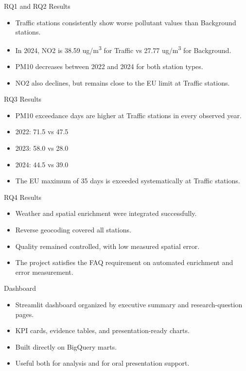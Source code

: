 \documentclass[aspectratio=169]{beamer}
\begin{document}
\begin{frame}{RQ1 and RQ2 Results}
\begin{itemize}
  \item Traffic stations consistently show worse pollutant values than Background stations.
  \item In 2024, NO2 is 38.59 ug/m\textsuperscript{3} for Traffic vs 27.77 ug/m\textsuperscript{3} for Background.
  \item PM10 decreases between 2022 and 2024 for both station types.
  \item NO2 also declines, but remains close to the EU limit at Traffic stations.
\end{itemize}
\end{frame}

\begin{frame}{RQ3 Results}
\begin{itemize}
  \item PM10 exceedance days are higher at Traffic stations in every observed year.
  \item 2022: 71.5 vs 47.5
  \item 2023: 58.0 vs 28.0
  \item 2024: 44.5 vs 39.0
  \item The EU maximum of 35 days is exceeded systematically at Traffic stations.
\end{itemize}
\end{frame}

\begin{frame}{RQ4 Results}
\begin{itemize}
  \item Weather and spatial enrichment were integrated successfully.
  \item Reverse geocoding covered all stations.
  \item Quality remained controlled, with low measured spatial error.
  \item The project satisfies the FAQ requirement on automated enrichment and error measurement.
\end{itemize}
\end{frame}

\begin{frame}{Dashboard}
\begin{itemize}
  \item Streamlit dashboard organized by executive summary and research-question pages.
  \item KPI cards, evidence tables, and presentation-ready charts.
  \item Built directly on BigQuery marts.
  \item Useful both for analysis and for oral presentation support.
\end{itemize}
\end{frame}
\end{document}
